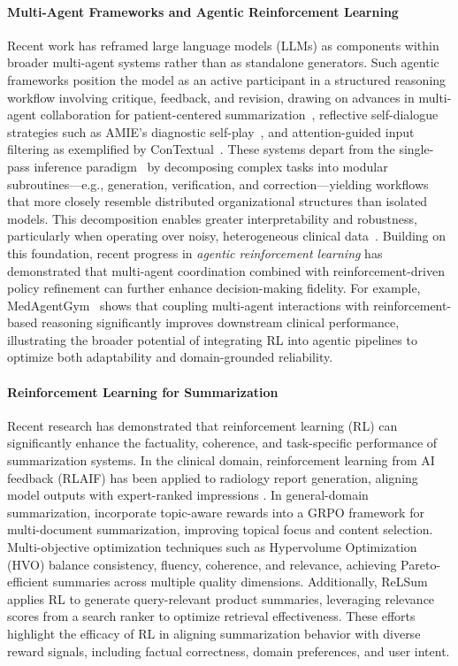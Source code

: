 \documentclass{article}
\begin{document}
\paragraph{Multi-Agent Frameworks and Agentic Reinforcement Learning} 
Recent work has reframed large language models (LLMs) as components within broader multi-agent systems rather than as standalone generators. Such agentic frameworks position the model as an active participant in a structured reasoning workflow involving critique, feedback, and revision, drawing on advances in multi-agent collaboration for patient-centered summarization~\citep{sudarshan2024agentic}, reflective self-dialogue strategies such as AMIE’s diagnostic self-play~\citep{tu2025amie}, and attention-guided input filtering as exemplified by ConTextual~\citep{piya2025contextual}. These systems depart from the single-pass inference paradigm~\citep{deeplearningai2024batch242} by decomposing complex tasks into modular subroutines—e.g., generation, verification, and correction—yielding workflows that more closely resemble distributed organizational structures than isolated models. This decomposition enables greater interpretability and robustness, particularly when operating over noisy, heterogeneous clinical data~\citep{cognitiveconcerns2024agentic}. Building on this foundation, recent progress in \textit{agentic reinforcement learning} has demonstrated that multi-agent coordination combined with reinforcement-driven policy refinement can further enhance decision-making fidelity. For example, MedAgentGym~\citep{xu2025medagentgym} shows that coupling multi-agent interactions with reinforcement-based reasoning significantly improves downstream clinical performance, illustrating the broader potential of integrating RL into agentic pipelines to optimize both adaptability and domain-grounded reliability.



\paragraph{Reinforcement Learning for Summarization} 
Recent research has demonstrated that reinforcement learning (RL) can significantly enhance the factuality, coherence, and task-specific performance of summarization systems. In the clinical domain, reinforcement learning from AI feedback (RLAIF) has been applied to radiology report generation, aligning model outputs with expert-ranked impressions \citep{yang2025aligning}. In general-domain summarization, \citet{li2025topic} incorporate topic-aware rewards into a GRPO framework for multi-document summarization, improving topical focus and content selection. Multi-objective optimization techniques such as Hypervolume Optimization (HVO) \citep{song2025hvo} balance consistency, fluency, coherence, and relevance, achieving Pareto-efficient summaries across multiple quality dimensions. Additionally, ReLSum \citep{yadav2025query} applies RL to generate query-relevant product summaries, leveraging relevance scores from a search ranker to optimize retrieval effectiveness. These efforts highlight the efficacy of RL in aligning summarization behavior with diverse reward signals, including factual correctness, domain preferences, and user intent.
\end{document}
